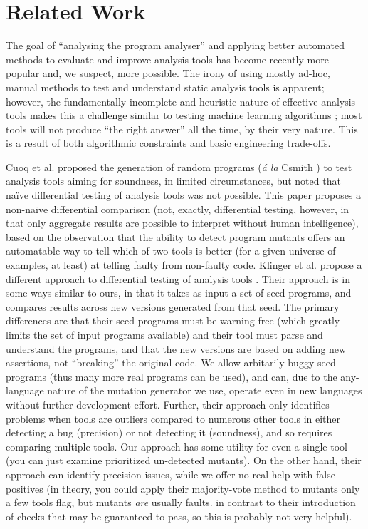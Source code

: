 \section{Related Work}

The goal of ``analysing the program analyser'' \cite{cadar2016analysing} and applying better automated methods to evaluate and improve analysis tools has become recently more popular and, we suspect, more possible.  The irony of using mostly ad-hoc, manual methods to test and understand static analysis tools is apparent; however, the fundamentally incomplete and heuristic nature of effective analysis tools makes this a challenge similar to testing machine learning algorithms \cite{OnlyOracle}; most tools will not produce ``the right answer'' all the time, by their very nature.  This is a result of both algorithmic constraints and basic engineering trade-offs.

Cuoq et al. \cite{regehrRandom} proposed the generation of random programs (\emph{\'a la} Csmith \cite{csmith}) to test analysis tools aiming for soundness, in limited circumstances, but noted that na\"ive differential testing of analysis tools was not possible.  This paper proposes a non-na\"ive differential comparison (not, exactly, differential testing, however, in that only aggregate results are possible to interpret without human intelligence), based on the observation that the ability to detect program mutants offers an automatable way to tell which of two tools is better (for a given universe of examples, at least) at telling faulty from non-faulty code.  Klinger et al. propose a different approach to differential testing of analysis tools \cite{klinger2019differentially}.  Their approach is in some ways similar to ours, in that it takes as input a set of seed programs, and compares results across new versions generated from that seed.  The primary differences are that their seed programs must be warning-free (which greatly limits the set of input programs available) and their tool must parse and understand the programs, and that the new versions are based on adding new assertions, not ``breaking'' the original code.  We allow arbitarily buggy seed programs (thus many more real programs can be used), and can, due to the any-language nature of the mutation generator we use, operate even in new languages without further development effort.  Further, their approach only identifies problems when tools are outliers compared to numerous other tools in either detecting a bug (precision) or not detecting it (soundness), and so requires comparing multiple tools.  Our approach has some utility for even a single tool (you can just examine prioritized un-detected mutants).  On the other hand, their approach can identify precision issues, while we offer no real help with false positives (in theory, you could apply their majority-vote method to mutants only a few tools flag, but mutants \emph{are} usually faults. in contrast to their introduction of checks that may be guaranteed to pass, so this is probably not very helpful).